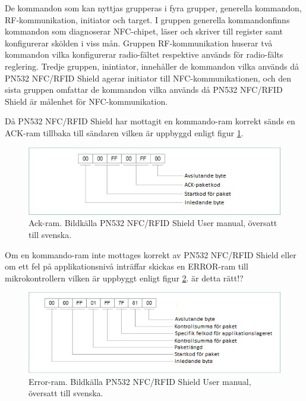 \documentclass[11pt]{article}
\begin{document}
De kommandon som kan nyttjas grupperas i fyra grupper, generella kommandon, RF-kommunikation, initiator och target. I gruppen generella kommandonfinns kommandon som diagnoserar NFC-chipet, läser och skriver till register samt konfigurerar skölden i viss mån. Gruppen RF-kommunikation huserar två kommandon vilka konfigurerar radio-fältet respektive används för radio-fälts reglering. Tredje gruppen, inintiator, innehåller de kommandon vilka används då PN532 NFC/RFID Shield agerar initiator till NFC-kommunikationen, och den sista gruppen omfattar de kommandon vilka används då PN532 NFC/RFID Shield är målenhet för NFC-kommunikation.

Då PN532 NFC/RFID Shield har mottagit en kommando-ram korrekt sänds en ACK-ram tillbaka till sändaren vilken är uppbyggd enligt figur \ref{fig:PN532_shield_ack}.

\begin{figure}[H]
\centering
\includegraphics[scale=0.8]{PN532_shield_ack.jpg}
\caption{Ack-ram. Bildkälla PN532 NFC/RFID Shield User manual, översatt till svenska.}
\label{fig:PN532_shield_ack}
\end{figure}


Om en kommando-ram inte mottages korrekt av PN532 NFC/RFID Shield eller om ett fel på applikationsnivå inträffar skickas en ERROR-ram till mikrokontrollern vilken är uppbyggt enligt figur \ref{fig:PN532_shield_error}. är detta rätt!?

\begin{figure}[H]
\centering
\includegraphics[scale=0.8]{PN532_shield_error.jpg}
\caption{Error-ram. Bildkälla PN532 NFC/RFID Shield User manual, översatt till svenska.}
\label{fig:PN532_shield_error}
\end{figure}
\end{document}
